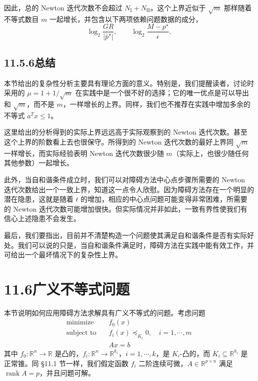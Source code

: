 \documentclass[UTF8, 12pt, fontset=fandol, oneside]{ctexart}
\begin{document}
因此，总的 Newton 迭代次数不会超过 $N_{\mathrm{I}}+N_{\mathrm{II}}$。这个上界近似于 $\sqrt{m}$ 那样随着不等式数目 $m$ 一起增长，并包含以下两项依赖问题数据的成分，
\[
\log_2\frac{GR}{|\bar{p}^\star|},\qquad \log_2\frac{M-p^\star}{\epsilon}.
\]

\subsection*{11.5.6\quad 总结}

本节给出的复杂性分析主要具有理论方面的意义。特别是，我们提醒读者，讨论时采用的 $\mu=1+1/\sqrt{m}$ 在实践中是一个很不好的选择；它的唯一优点是可以导出和 $\sqrt{m}$，而不是 $m$，一样增长的上界。同样，我们也不推荐在实践中增加多余的不等式 $a^Tx\leq 1$。

这里给出的分析得到的实际上界远远高于实际观察到的 Newton 迭代次数。甚至这个上界的阶数看上去也很保守。所得到的 Newton 迭代次数的最好上界同 $\sqrt{m}$ 一样增长，而实际经验表明 Newton 迭代次数很少随 $m$（实际上，也很少随任何其他参数）一起增长。

此外，当自和谐条件成立时，我们可以对障碍方法中心点步骤所需要的 Newton 迭代次数给出一个一致上界，知道这一点令人欣慰。因为障碍方法存在一个明显的潜在隐患，这就是随着 $t$ 的增加，相应的中心点问题可能变得非常困难，所需要的 Newton 迭代次数可能增加很快。但实际情况并非如此，一致有界性使我们有信心上述隐患不会发生。

最后，我们要指出，目前并不清楚构造一个问题使其满足自和谐条件是否有实际好处。我们可以说的只是，当自和谐条件满足时，障碍方法在实践中能有效工作，并可给出一个最坏情况下的复杂性上界。

\section*{11.6\quad 广义不等式问题}

本节说明如何应用障碍方法求解具有广义不等式的问题。考虑问题
\begin{equation}
\begin{aligned}
\text{minimize}\quad & f_0(x)\\
\text{subject to}\quad & f_i(x)\preceq_{K_i}0,\quad i=1,\cdots,m\\
& Ax=b
\end{aligned}
\tag{11.38}
\end{equation}
其中 $f_0:\mathbb{R}^n\to\mathbb{R}$ 是凸的，$f_i:\mathbb{R}^n\to\mathbb{R}^{k_i}$，$i=1,\cdots,k$，是 $K_i$-凸的，而 $K_i\subseteq\mathbb{R}^{k_i}$ 是正常锥。同 \S11.1 节一样，我们假定函数 $f_i$ 二阶连续可微，$A\in\mathbb{R}^{p\times n}$ 满足 $\operatorname{rank}A=p$，并且问题可解。
\end{document}
